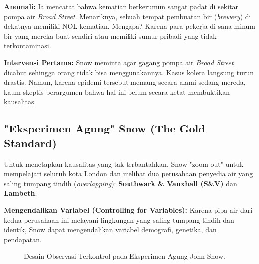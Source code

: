 \documentclass[12pt,a4paper]{article}
\begin{document}
\textbf{Anomali:} Ia mencatat bahwa kematian berkerumun sangat padat di sekitar pompa air \textit{Broad Street}. Menariknya, sebuah tempat pembuatan bir (\textit{brewery}) di dekatnya memiliki NOL kematian. Mengapa? Karena para pekerja di sana minum bir yang mereka buat sendiri atau memiliki sumur pribadi yang tidak terkontaminasi.

\textbf{Intervensi Pertama:} Snow meminta agar gagang pompa air \textit{Broad Street} dicabut sehingga orang tidak bisa menggunakannya. Kasus kolera langsung turun drastis. Namun, karena epidemi tersebut memang secara alami sedang mereda, kaum skeptis berargumen bahwa hal ini belum secara ketat membuktikan kausalitas.

\subsection{"Eksperimen Agung" Snow (The Gold Standard)}
Untuk menetapkan kausalitas yang tak terbantahkan, Snow "zoom out" untuk mempelajari seluruh kota London dan melihat dua perusahaan penyedia air yang saling tumpang tindih (\textit{overlapping}): \textbf{Southwark \& Vauxhall (S\&V)} dan \textbf{Lambeth}.

\textbf{Mengendalikan Variabel (Controlling for Variables):} Karena pipa air dari kedua perusahaan ini melayani lingkungan yang saling tumpang tindih dan identik, Snow dapat mengendalikan variabel demografi, genetika, dan pendapatan.

\begin{figure}[h]
    \centering
    \caption{Desain Observasi Terkontrol pada Eksperimen Agung John Snow.}
\end{figure}
\end{document}
